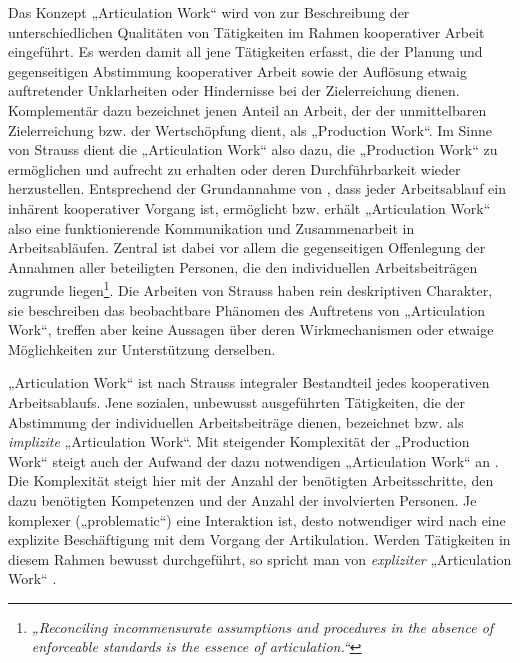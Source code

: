 Das Konzept „Articulation Work“ wird von \citet{Strauss85} zur Beschreibung der unterschiedlichen Qualitäten von Tätigkeiten im Rahmen kooperativer Arbeit eingeführt. Es werden damit all jene Tätigkeiten erfasst, die der Planung und gegenseitigen Abstimmung kooperativer Arbeit sowie der Auflösung etwaig auftretender Unklarheiten oder Hindernisse bei der Zielerreichung dienen. Komplementär dazu bezeichnet \citet{Fujimura87} jenen Anteil an Arbeit, der der unmittelbaren Zielerreichung bzw. der Wertschöpfung dient, als „Production Work“. Im Sinne von Strauss dient die „Articulation Work“ also dazu, die „Production Work“ zu ermöglichen und aufrecht zu erhalten oder deren Durchführbarkeit wieder herzustellen. Entsprechend der Grundannahme von \citep{Strauss85}, dass jeder Arbeitsablauf ein inhärent kooperativer Vorgang ist, ermöglicht bzw. erhält „Articulation Work“ also eine funktionierende Kommunikation und Zusammenarbeit in Arbeitsabläufen. Zentral ist dabei vor allem die gegenseitigen Offenlegung der Annahmen aller beteiligten Personen, die den individuellen Arbeitsbeiträgen zugrunde liegen\footnote{\emph{„Reconciling incommensurate assumptions and procedures in the absence of enforceable standards is the essence of articulation.“}\citep[][S. 266]{Gerson86}}. Die Arbeiten von Strauss haben rein deskriptiven Charakter, sie beschreiben das beobachtbare Phänomen des Auftretens von „Articulation Work“, treffen aber keine Aussagen über deren Wirkmechanismen oder etwaige Möglichkeiten zur Unterstützung derselben.

„Articulation Work“ ist nach Strauss integraler Bestandteil jedes kooperativen Arbeitsablaufs. Jene sozialen, unbewusst ausgeführten Tätigkeiten, die der Abstimmung der individuellen Arbeitsbeiträge dienen, bezeichnet \citet{Strauss88} bzw. \citet{Fjuk97} als \emph{implizite} „Articulation Work“.  Mit steigender Komplexität der „Production Work“ steigt auch der Aufwand der dazu notwendigen „Articulation Work“ an \citep{Strauss88}. Die Komplexität steigt hier mit der Anzahl der benötigten Arbeitsschritte, den dazu benötigten Kompetenzen und der Anzahl der involvierten Personen. Je komplexer („problematic“) eine Interaktion ist, desto notwendiger wird nach \citep{Strauss88} eine explizite Beschäftigung mit dem Vorgang der Artikulation. Werden Tätigkeiten in diesem Rahmen bewusst durchgeführt, so spricht man von \emph{expliziter} „Articulation Work“ \citep{Strauss88} \citep{Fjuk97}. 

